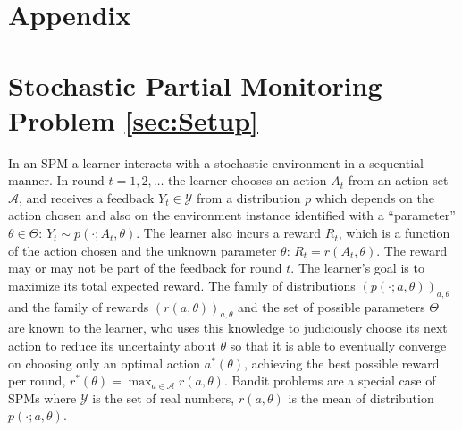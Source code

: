 \documentclass[11pt]{article} %
\newcommand{\Y}{\mathcal{Y}}
\newcommand{\A}{\mathcal{A}}
\begin{document}
\section{Appendix}
%
\section*{Stochastic Partial Monitoring Problem \ref{sec:Setup}}
In an SPM a learner interacts with a stochastic environment in a sequential manner.
In round $t=1,2,\dots$ the learner chooses an action $A_t$ from an action set $\A$, and receives a feedback $Y_t\in \Y$
from a distribution $p$ which depends on the action chosen and also on the environment instance identified
with a ``parameter'' $\theta\in\Theta$:
$Y_t \sim p(\cdot;A_t,\theta)$. 
The learner also incurs a reward $R_t$, which is a function of the action chosen and the unknown parameter $\theta$:
$R_t = r(A_t,\theta)$. 
The reward may or may not be part of the feedback for round $t$.
The learner's goal is to maximize its total expected reward.
The family of distributions $(p(\cdot;a,\theta))_{a,\theta}$ and the family of rewards $(r(a,\theta))_{a,\theta}$
and the set of possible parameters $\Theta$ are known to the learner, who uses this knowledge to judiciously choose
its next action to reduce its uncertainty about $\theta$ so that it is able to eventually converge on choosing only an 
optimal action $a^*(\theta)$, achieving the best possible reward per round, $r^*(\theta) = \max_{a\in \A} r(a,\theta)$.  Bandit problems are a special case of SPMs where $\Y$ is the set of real numbers, $r(a,\theta)$ is the mean of distribution $p(\cdot;a,\theta)$.
\end{document}
